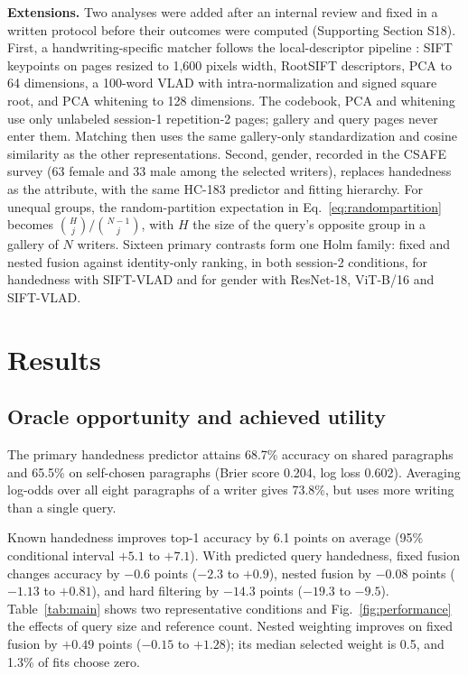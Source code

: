 \documentclass[ASNA,twocolumn]{USG}
\begin{document}
\textbf{Extensions.} Two analyses were added after an internal review and fixed in a written protocol before their outcomes were computed (Supporting Section S18). First, a handwriting-specific matcher follows the local-descriptor pipeline \cite{lowe2004sift,arandjelovic2012rootsift,jegou2010vlad,christlein2017gmm}: SIFT keypoints on pages resized to 1,600 pixels width, RootSIFT descriptors, PCA to 64 dimensions, a 100-word VLAD with intra-normalization and signed square root, and PCA whitening to 128 dimensions. The codebook, PCA and whitening use only unlabeled session-1 repetition-2 pages; gallery and query pages never enter them. Matching then uses the same gallery-only standardization and cosine similarity as the other representations. Second, gender, recorded in the CSAFE survey (63 female and 33 male among the selected writers), replaces handedness as the attribute, with the same HC-183 predictor and fitting hierarchy. For unequal groups, the random-partition expectation in Eq.~\eqref{eq:randompartition} becomes $\binom{H}{j}/\binom{N-1}{j}$, with $H$ the size of the query's opposite group in a gallery of $N$ writers. Sixteen primary contrasts form one Holm family: fixed and nested fusion against identity-only ranking, in both session-2 conditions, for handedness with SIFT-VLAD and for gender with ResNet-18, ViT-B/16 and SIFT-VLAD.

\section{Results}
\label{sec:results}
\subsection{Oracle opportunity and achieved utility}
The primary handedness predictor attains 68.7\% accuracy on shared paragraphs and 65.5\% on self-chosen paragraphs (Brier score 0.204, log loss 0.602). Averaging log-odds over all eight paragraphs of a writer gives 73.8\%, but uses more writing than a single query.

Known handedness improves top-1 accuracy by 6.1 points on average (95\% conditional interval $+5.1$ to $+7.1$). With predicted query handedness, fixed fusion changes accuracy by $-0.6$ points ($-2.3$ to $+0.9$), nested fusion by $-0.08$ points ($-1.13$ to $+0.81$), and hard filtering by $-14.3$ points ($-19.3$ to $-9.5$). Table~\ref{tab:main} shows two representative conditions and Fig.~\ref{fig:performance} the effects of query size and reference count. Nested weighting improves on fixed fusion by $+0.49$ points ($-0.15$ to $+1.28$); its median selected weight is 0.5, and 1.3\% of fits choose zero.
\end{document}
